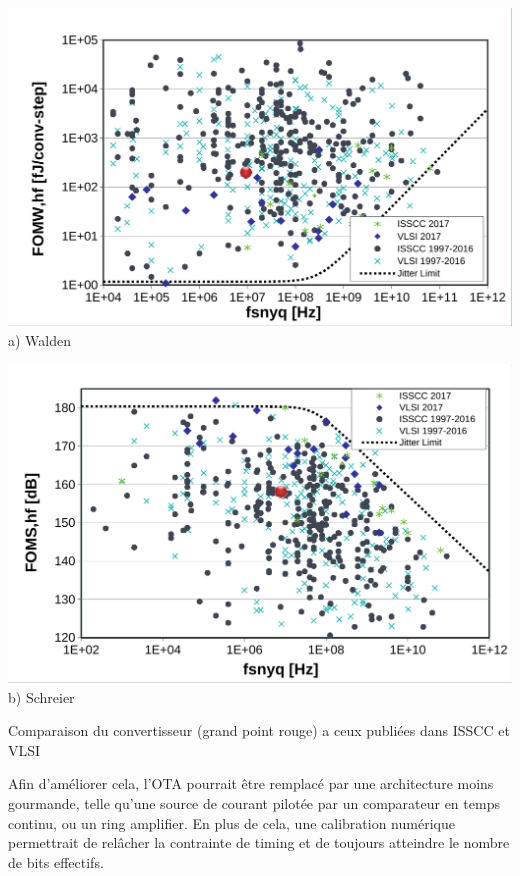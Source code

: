 \begin{mdframed}[linecolor=Prune,linewidth=1]
    \begin{center}
        \centering
        \begin{minipage}[b]{0.49\linewidth}
            \centering
            \includegraphics[width=\textwidth]{Abstract/Figs/WaldenFoM-a.pdf}
            a) Walden
        \end{minipage}
        \begin{minipage}[b]{0.49\linewidth}
            \centering
            \includegraphics[width=\textwidth]{Abstract/Figs/SchreierFoM-a.pdf}
            b) Schreier
        \end{minipage}
        \caption[]{Comparaison du convertisseur (grand point rouge) a ceux publiées dans ISSCC et VLSI}
        \label{fig:fom-fr}
    \end{center}
    
    Afin d'améliorer cela, l'OTA pourrait être remplacé par une architecture moins gourmande, telle qu'une source de courant pilotée par un comparateur en temps continu, ou un ring amplifier. En plus de cela, une calibration numérique permettrait de relâcher la contrainte de timing et de toujours atteindre le nombre de bits effectifs.
    

\end{mdframed}
